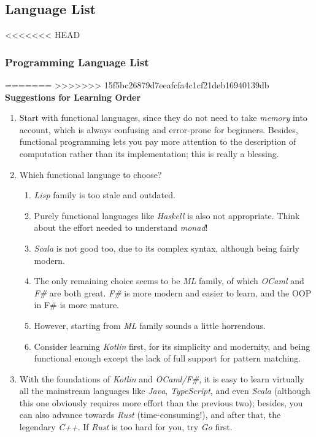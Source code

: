 \documentclass{article}
\begin{document}
\subsection{Language List}

<<<<<<< HEAD
\subsubsection{Programming Language List}

=======
>>>>>>> 15f5bc26879d7eeafcfa4c1cf21deb16940139db
\textbf{Suggestions for Learning Order}

\begin{enumerate}
    \item Start with functional languages, since they do not need to take \emph{memory} into account, which is always confusing and error-prone for beginners.
    Besides, functional programming lets you pay more attention to the description of computation rather than its implementation; this is really a blessing.
    \item Which functional language to choose?
    \begin{enumerate}
        \item \emph{Lisp} family is too stale and outdated.
        \item Purely functional languages like \emph{Haskell} is also not appropriate.
        Think about the effort needed to understand \emph{monad}!
        \item \emph{Scala} is not good too, due to its complex syntax, although being fairly modern.
        \item The only remaining choice seems to be \emph{ML} family, of which \emph{OCaml} and \emph{F\#} are both great. \emph{F\#} is more modern and easier to learn, and the OOP in F\# is more mature.
        \item However, starting from \emph{ML} family sounds a little horrendous.
        \item Consider learning \emph{Kotlin} first, for its simplicity and modernity, and being functional enough except the lack of full support for pattern matching.
    \end{enumerate}
    \item With the foundations of \emph{Kotlin} and \emph{OCaml/F\#}, it is easy to learn virtually all the mainstream languages like \emph{Java}, \emph{TypeScript}, and even \emph{Scala} (although this one obviously requires more effort than the previous two); besides, you can also advance towards \emph{Rust} (time-consuming!), and after that, the legendary \emph{C++}.
    If \emph{Rust} is too hard for you, try \emph{Go} first.
\end{enumerate}
\end{document}
